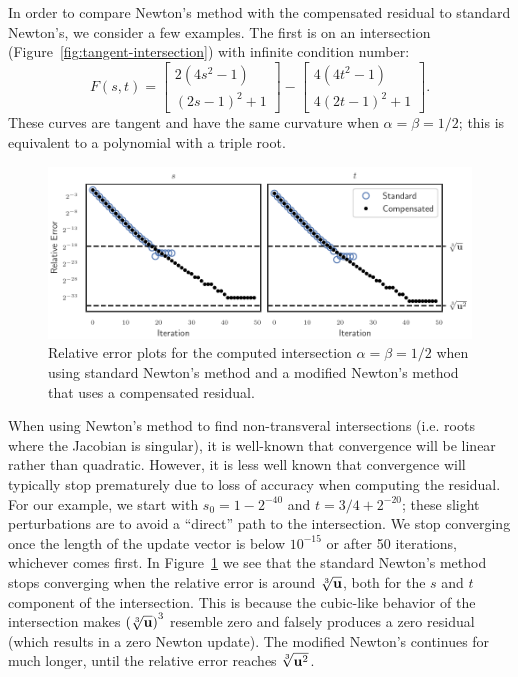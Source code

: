 In order to compare Newton's method with the compensated residual to
standard Newton's, we consider a few examples. The first is on an
intersection (Figure~\ref{fig:tangent-intersection}) with infinite
condition number:
\begin{equation}
F(s, t) = \left[ \begin{array}{c} 2(4s^2 - 1) \\ (2s - 1)^2 + 1
\end{array}\right] - \left[ \begin{array}{c} 4(4t^2 - 1) \\ 4(2t - 1)^2 + 1
\end{array}\right].
\end{equation}
These curves are tangent and have the same curvature when \(\alpha = \beta =
1/2\); this is equivalent to a polynomial with a triple root.

\begin{figure}
  \includegraphics{../images/compensated-newton/newton_linear_converge.pdf}
  \centering
  \captionsetup{width=.75\linewidth}
  \caption{Relative error plots for the computed intersection
    \(\alpha = \beta = 1/2\)
    when using standard Newton's method and a modified Newton's method that
    uses a compensated residual.}
  \label{fig:newton-linear-converge}
\end{figure}

When using Newton's method to find non-transveral intersections (i.e. roots
where the Jacobian is singular), it is well-known that convergence will
be linear rather than quadratic. However, it is less well known that
convergence will typically stop prematurely due to loss of accuracy when
computing the residual. For our example, we start with \(s_0 = 1 - 2^{-40}\)
and \(t = 3/4 + 2^{-20}\); these slight perturbations are to avoid a
``direct'' path to the intersection. We stop converging once the length
of the update vector is below \(10^{-15}\) or after 50 iterations,
whichever comes first. In Figure~\ref{fig:newton-linear-converge}
we see that the standard Newton's method stops converging when the relative
error is around \(\sqrt[3]{\mathbf{u}}\), both for the \(s\) and \(t\) component
of the intersection. This is because the cubic-like behavior of the
intersection makes \(\left(\sqrt[3]{\mathbf{u}}\right)^3\) resemble zero and
falsely produces a zero residual (which results in a zero Newton update).
The modified Newton's continues for much longer, until the relative error
reaches \(\sqrt[3]{\mathbf{u}^2}\).

